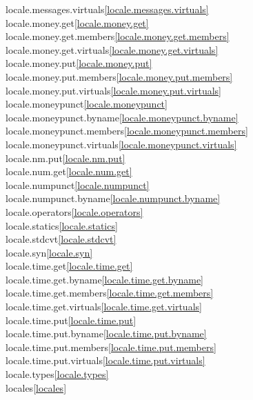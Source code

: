 \begin{multicols}{2}
locale.messages.virtuals\quad\ref{locale.messages.virtuals}\\
locale.money.get\quad\ref{locale.money.get}\\
locale.money.get.members\quad\ref{locale.money.get.members}\\
locale.money.get.virtuals\quad\ref{locale.money.get.virtuals}\\
locale.money.put\quad\ref{locale.money.put}\\
locale.money.put.members\quad\ref{locale.money.put.members}\\
locale.money.put.virtuals\quad\ref{locale.money.put.virtuals}\\
locale.moneypunct\quad\ref{locale.moneypunct}\\
locale.moneypunct.byname\quad\ref{locale.moneypunct.byname}\\
locale.moneypunct.members\quad\ref{locale.moneypunct.members}\\
locale.moneypunct.virtuals\quad\ref{locale.moneypunct.virtuals}\\
locale.nm.put\quad\ref{locale.nm.put}\\
locale.num.get\quad\ref{locale.num.get}\\
locale.numpunct\quad\ref{locale.numpunct}\\
locale.numpunct.byname\quad\ref{locale.numpunct.byname}\\
locale.operators\quad\ref{locale.operators}\\
locale.statics\quad\ref{locale.statics}\\
locale.stdcvt\quad\ref{locale.stdcvt}\\
locale.syn\quad\ref{locale.syn}\\
locale.time.get\quad\ref{locale.time.get}\\
locale.time.get.byname\quad\ref{locale.time.get.byname}\\
locale.time.get.members\quad\ref{locale.time.get.members}\\
locale.time.get.virtuals\quad\ref{locale.time.get.virtuals}\\
locale.time.put\quad\ref{locale.time.put}\\
locale.time.put.byname\quad\ref{locale.time.put.byname}\\
locale.time.put.members\quad\ref{locale.time.put.members}\\
locale.time.put.virtuals\quad\ref{locale.time.put.virtuals}\\
locale.types\quad\ref{locale.types}\\
locales\quad\ref{locales}\\

\end{multicols}
